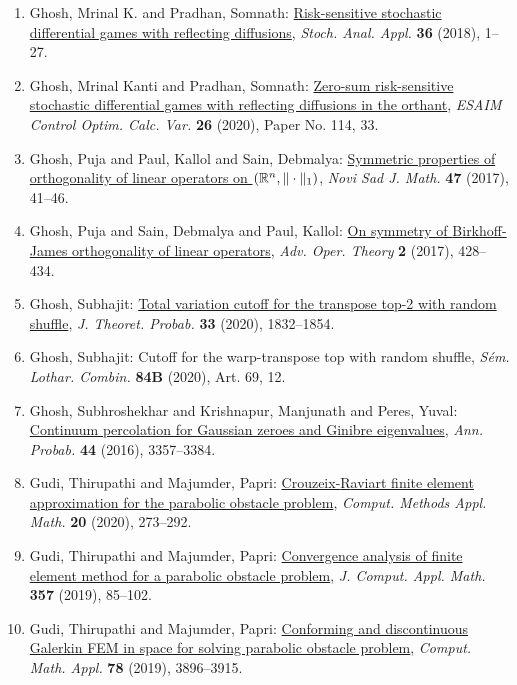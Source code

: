 \begin{enumerate}
\item Ghosh, Mrinal K. and Pradhan, Somnath: \href{https://doi.org/10.1080/07362994.2017.1356732}{Risk-sensitive stochastic differential games with reflecting
diffusions}, \emph{Stoch. Anal. Appl.} {\bf 36} (2018), 1--27.
\item Ghosh, Mrinal Kanti and Pradhan, Somnath: \href{https://doi.org/10.1051/cocv/2020029}{Zero-sum risk-sensitive stochastic differential games with
reflecting diffusions in the orthant}, \emph{ESAIM Control Optim. Calc. Var.} {\bf 26} (2020), Paper No. 114, 33.
\item Ghosh, Puja and Paul, Kallol and Sain, Debmalya: \href{https://doi.org/10.30755/nsjom.04671}{Symmetric properties of orthogonality of linear operators on
{$(\Bbb R^n,\|\cdot\|_1)$}}, \emph{Novi Sad J. Math.} {\bf 47} (2017), 41--46.
\item Ghosh, Puja and Sain, Debmalya and Paul, Kallol: \href{https://doi.org/10.22034/aot.1703-1137}{On symmetry of {B}irkhoff-{J}ames orthogonality of linear
operators}, \emph{Adv. Oper. Theory} {\bf 2} (2017), 428--434.
\item Ghosh, Subhajit: \href{https://doi.org/10.1007/s10959-019-00945-6}{Total variation cutoff for the transpose top-2 with random
shuffle}, \emph{J. Theoret. Probab.} {\bf 33} (2020), 1832--1854.
\item Ghosh, Subhajit: Cutoff for the warp-transpose top with random shuffle, \emph{S\'{e}m. Lothar. Combin.} {\bf 84B} (2020), Art. 69, 12.
\item Ghosh, Subhroshekhar and Krishnapur, Manjunath and Peres,
Yuval: \href{https://doi.org/10.1214/15-AOP1051}{Continuum percolation for {G}aussian zeroes and {G}inibre
eigenvalues}, \emph{Ann. Probab.} {\bf 44} (2016), 3357--3384.
\item Gudi, Thirupathi and Majumder, Papri: \href{https://doi.org/10.1515/cmam-2019-0057}{Crouzeix-{R}aviart finite element approximation for the
parabolic obstacle problem}, \emph{Comput. Methods Appl. Math.} {\bf 20} (2020), 273--292.
\item Gudi, Thirupathi and Majumder, Papri: \href{https://doi.org/10.1016/j.cam.2019.02.026}{Convergence analysis of finite element method for a parabolic
obstacle problem}, \emph{J. Comput. Appl. Math.} {\bf 357} (2019), 85--102.
\item Gudi, Thirupathi and Majumder, Papri: \href{https://doi.org/10.1016/j.camwa.2019.06.022}{Conforming and discontinuous {G}alerkin {FEM} in space for
solving parabolic obstacle problem}, \emph{Comput. Math. Appl.} {\bf 78} (2019), 3896--3915.

\end{enumerate}
